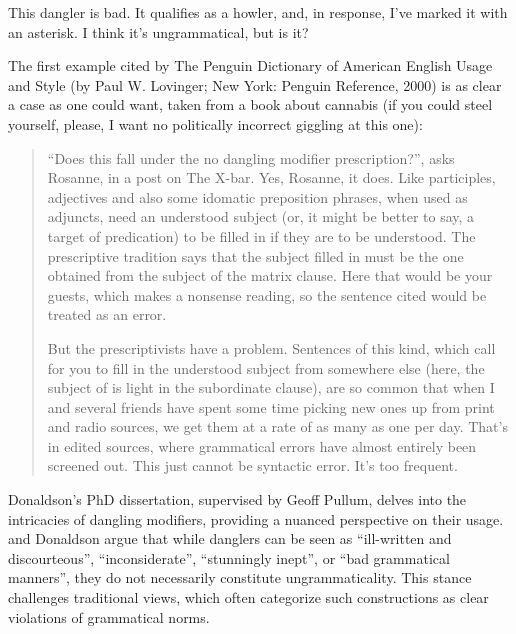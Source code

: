 This dangler is bad. It qualifies as a howler, and, in response, I've marked it with an asterisk. I think it's ungrammatical, but is it?

The first example cited by The Penguin Dictionary of American English Usage and Style (by Paul W. Lovinger; New York: Penguin Reference, 2000) is as clear a case as one could want, taken from a book about cannabis (if you could steel yourself, please, I want no politically incorrect giggling at this one):

\ea
 \z
\z

\begin{quote}
``Does this fall under the no dangling modifier prescription?'', asks Rosanne, in a post on The X-bar. Yes, Rosanne, it does. Like participles, adjectives and also some idomatic preposition phrases, when used as adjuncts, need an understood subject (or, it might be better to say, a target of predication) to be filled in if they are to be understood. The prescriptive tradition says that the subject filled in must be the one obtained from the subject of the matrix clause. Here that would be your guests, which makes a nonsense reading, so the sentence cited would be treated as an error.

But the prescriptivists have a problem. Sentences of this kind, which call for you to fill in the understood subject from somewhere else (here, the subject of is light in the subordinate clause), are so common that when I and several friends have spent some time picking new ones up from print and radio sources, we get them at a rate of as many as one per day. That's in edited sources, where grammatical errors have almost entirely been screened out. This just cannot be syntactic error. It's too frequent.\hfill\citep{LanguageLog218}
\end{quote}

Donaldson's PhD dissertation, supervised by Geoff Pullum, delves into the intricacies of dangling modifiers, providing a nuanced perspective on their usage. \citep{LanguageLog218,LanguageLog1938,LanguageLog1973,LanguageLog2153} and Donaldson argue that while danglers can be seen as ``ill-written and discourteous'', ``inconsiderate'', ``stunningly inept'', or ``bad grammatical manners'', they do not necessarily constitute ungrammaticality. This stance challenges traditional views, which often categorize such constructions as clear violations of grammatical norms.


